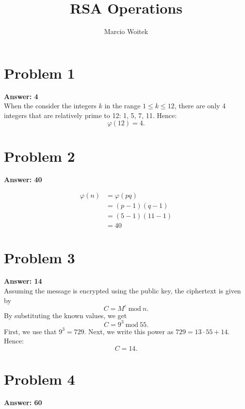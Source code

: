 \documentclass[11pt]{article}
\author{Marcio Woitek}
\date{}
\title{RSA Operations}
\newcommand{\Mod}{\:\mathrm{mod}\:}
\begin{document}
\maketitle
\thispagestyle{empty}
\pagestyle{empty}

\section*{Problem 1}
\label{sec:org734283a}
\textbf{Answer: 4}\\[0pt]

When the consider the integers \(k\) in the range \(1\leq k\leq 12\), there are only 4
integers that are relatively prime to 12: 1, 5, 7, 11. Hence:
\begin{equation}
\varphi(12)=4.
\end{equation}

\section*{Problem 2}
\label{sec:org5b6634d}
\textbf{Answer: 40}

\begin{align}
\varphi(n)&=\varphi(pq)\\
&=(p-1)(q-1)\\
&=(5-1)(11-1)\\
&=40
\end{align}

\section*{Problem 3}
\label{sec:org54a212f}
\textbf{Answer: 14}\\[0pt]

Assuming the message is encrypted using the public key, the ciphertext is given by
\begin{equation}
C=M^e\Mod n.
\end{equation}
By substituting the known values, we get
\begin{equation}
C=9^3\Mod 55.
\end{equation}
First, we use that \(9^3=729\). Next, we write this power as \(729=13\cdot 55+14\).
Hence:
\begin{equation}
C=14.
\end{equation}

\section*{Problem 4}
\label{sec:org4fe052e}
\textbf{Answer: 60}
\end{document}
